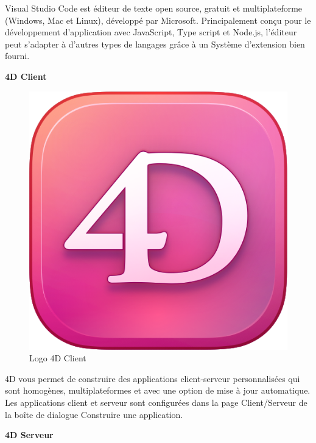 Visual Studio Code est éditeur de texte open source, gratuit et multiplateforme (Windows, Mac et Linux), développé
par Microsoft. Principalement conçu pour le développement
d’application avec JavaScript, Type script et Node.js, l’éditeur peut s’adapter à d’autres types de langages grâce à un
Système d’extension bien fourni.
\newline

\large 
\textbf{4D Client}

\begin{figure}[htbp]
   \centering
   \includegraphics[scale=0.2]{Images/4dcl.png} 
   \caption{Logo 4D Client}
   \label{fig:4dcl}
\end{figure}

4D vous permet de construire des applications client-serveur 
personnalisées qui sont homogènes, multiplateformes et avec 
une option de mise à jour automatique. Les applications 
client et serveur sont configurées dans la page Client/Serveur 
de la boîte de dialogue Construire une application.
\newline

\large 
\textbf{4D Serveur}

